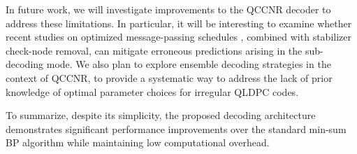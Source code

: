 \documentclass[%
 reprint,
 amsmath,amssymb,
 aps,
pra,
showkeys,
]{revtex4-2}
\begin{document}
In future work, we will investigate improvements to the QCCNR decoder to address these limitations. 
In particular, it will be interesting to examine whether recent studies on optimized message-passing schedules \cite{casado2007informed, moradi2026sequential}, combined with stabilizer check-node removal, can mitigate erroneous predictions arising in the sub-decoding mode.
We also plan to explore ensemble decoding strategies \cite{muller2025improved, koutsioumpas2025automorphism} in the context of QCCNR, to provide a systematic way to address the lack of prior knowledge of optimal parameter choices for irregular QLDPC codes.

To summarize, despite its simplicity, the proposed decoding architecture demonstrates significant performance improvements over the standard min-sum BP algorithm while maintaining low computational overhead. 
\end{document}
